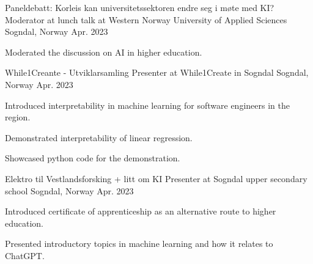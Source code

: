
\begin{cventries}

\cventry
  {Paneldebatt: Korleis kan universitetssektoren endre seg i møte med KI?} %
  {Moderator at lunch talk at Western Norway University of Applied Sciences} %
  {Sogndal, Norway} %
  {Apr. 2023} %
  {
    \begin{cvitems} %
      \item {Moderated the discussion on AI in higher education.}
    \end{cvitems}
  }


\cventry
  {While1Creante - Utviklarsamling} %
  {Presenter at While1Create in Sogndal} %
  {Sogndal, Norway} %
  {Apr. 2023} %
  {
    \begin{cvitems} %
      \item {Introduced interpretability in machine learning for software engineers in the region.}
      \item {Demonstrated interpretability of linear regression.}
      \item {Showcased python code for the demonstration.}
    \end{cvitems}
  }


\cventry
  {Elektro til Vestlandsforsking + litt om KI} %
  {Presenter at Sogndal upper secondary school} %
  {Sogndal, Norway} %
  {Apr. 2023} %
  {
    \begin{cvitems} %
      \item {Introduced certificate of apprenticeship as an alternative route to higher education.}
      \item {Presented introductory topics in machine learning and how it relates to ChatGPT.}
    \end{cvitems}
  }


\end{cventries}

